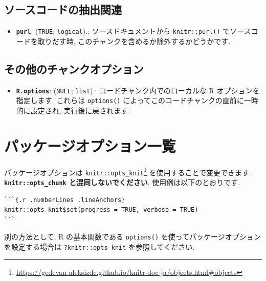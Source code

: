\documentclass[
  11pt,
  lualatex,
  ja=standard]{bxjsreport}
\providecommand{\tightlist}{%
  \setlength{\itemsep}{0pt}\setlength{\parskip}{0pt}}
\renewcommand{\href}[2]{#2\footnote{\url{#1}}}
\begin{document}
\hypertarget{ux30bdux30fcux30b9ux30b3ux30fcux30c9ux306eux62bdux51faux95a2ux9023}{%
\subsection{ソースコードの抽出関連}\label{ux30bdux30fcux30b9ux30b3ux30fcux30c9ux306eux62bdux51faux95a2ux9023}}

\begin{itemize}
\tightlist
\item
  \textbf{\texttt{purl}}: (\texttt{TRUE}; \texttt{logical}).: ソースドキュメントから \texttt{knitr::purl()} でソースコードを取りだす時, このチャンクを含めるか除外するかどうかです.
\end{itemize}

\hypertarget{ux305dux306eux4ed6ux306eux30c1ux30e3ux30f3ux30afux30aaux30d7ux30b7ux30e7ux30f3}{%
\subsection{その他のチャンクオプション}\label{ux305dux306eux4ed6ux306eux30c1ux30e3ux30f3ux30afux30aaux30d7ux30b7ux30e7ux30f3}}

\begin{itemize}
\tightlist
\item
  \textbf{\texttt{R.options}}: (\texttt{NULL}; \texttt{list}).: コードチャンク内でのローカルな R オプションを指定します. これらは \texttt{options()} によってこのコードチャンクの直前に一時的に設定され, 実行後に戻されます.
\end{itemize}

\hypertarget{package-options}{%
\section{パッケージオプション一覧}\label{package-options}}

パッケージオプションは \href{https://gedevan-aleksizde.github.io/knitr-doc-ja/objects.html\#objects}{\texttt{knitr::opts\_knit}} を使用することで変更できます. \textbf{\texttt{knitr::opts\_chunk} と混同しないでください}. 使用例は以下のとおりです.

\begin{verbatim}
```{.r .numberLines .lineAnchors}
knitr::opts_knit$set(progress = TRUE, verbose = TRUE)
```
\end{verbatim}

別の方法として, R の基本関数である \texttt{options()} を使ってパッケージオプションを設定する場合は \texttt{?knitr::opts\_knit} を参照してください.
\end{document}
